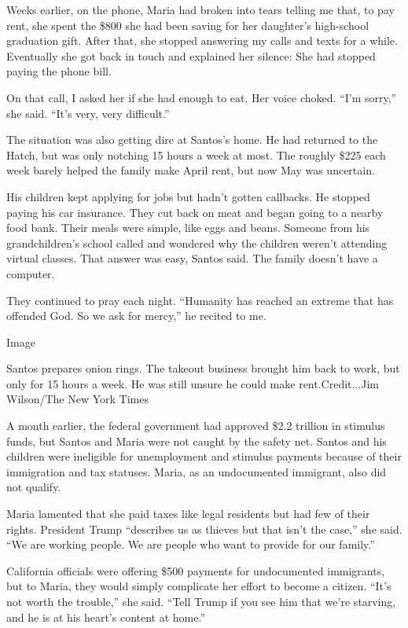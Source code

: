 Weeks earlier, on the phone, Maria had broken into tears telling me
that, to pay rent, she spent the \$800 she had been saving for her
daughter's high-school graduation gift. After that, she stopped
answering my calls and texts for a while. Eventually she got back in
touch and explained her silence: She had stopped paying the phone bill.

On that call, I asked her if she had enough to eat. Her voice choked.
``I'm sorry,'' she said. ``It's very, very difficult.''

The situation was also getting dire at Santos's home. He had returned to
the Hatch, but was only notching 15 hours a week at most. The roughly
\$225 each week barely helped the family make April rent, but now May
was uncertain.

His children kept applying for jobs but hadn't gotten callbacks. He
stopped paying his car insurance. They cut back on meat and began going
to a nearby food bank. Their meals were simple, like eggs and beans.
Someone from his grandchildren's school called and wondered why the
children weren't attending virtual classes. That answer was easy, Santos
said. The family doesn't have a computer.

They continued to pray each night. ``Humanity has reached an extreme
that has offended God. So we ask for mercy,'' he recited to me.

Image

Santos prepares onion rings. The takeout business brought him back to
work, but only for 15 hours a week. He was still unsure he could make
rent.Credit...Jim Wilson/The New York Times

A month earlier, the federal government had approved \$2.2 trillion in
stimulus funds, but Santos and Maria were not caught by the safety net.
Santos and his children were ineligible for unemployment and stimulus
payments because of their immigration and tax statuses. Maria, as an
undocumented immigrant, also did not qualify.

Maria lamented that she paid taxes like legal residents but had few of
their rights. President Trump ``describes us as thieves but that isn't
the case,'' she said. ``We are working people. We are people who want to
provide for our family.''

California officials were offering \$500 payments for undocumented
immigrants, but to Maria, they would simply complicate her effort to
become a citizen. ``It's not worth the trouble,'' she said. ``Tell Trump
if you see him that we're starving, and he is at his heart's content at
home.''

